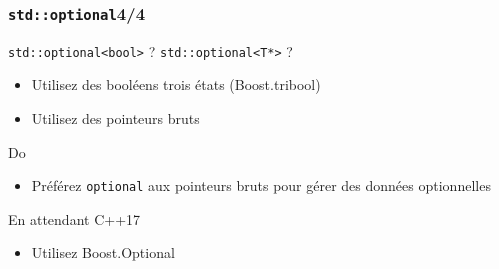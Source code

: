 \documentclass[C++.tex]{subfiles}
\begin{document}
\begin{frame}[fragile]
	\frametitle{\lstinline|std::optional|\titlehfill{}4/4}
	\begin{alertblock}{\lstinline|std::optional<bool>| ? \lstinline|std::optional<T*>| ?}
		\begin{itemize}
			\item Utilisez des booléens \og trois états\fg{} (Boost.tribool)
			\item Utilisez des pointeurs bruts
		\end{itemize}
	\end{alertblock}

	\begin{exampleblock}{Do}
		\begin{itemize}
			\item Préférez \lstinline|optional| aux pointeurs bruts pour gérer des données optionnelles
		\end{itemize}

	\end{exampleblock}

	\begin{block}{En attendant C++17}
		\begin{itemize}
			\item Utilisez Boost.Optional
		\end{itemize}
	\end{block}


\end{frame}
\end{document}
